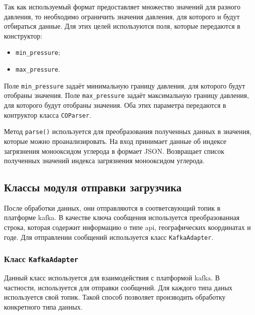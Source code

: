Так как используемый формат предоставляет множество значений для разного давления, то необходимо ограничить значения давления, для которого и будут отбираться данные.
Для этих целей используются поля, которые передаются в конструктор:
\begin{itemize}
    \item \texttt{min\_pressure};
    \item \texttt{max\_pressure}.
\end{itemize}

Поле \texttt{min\_pressure} задаёт минимальную границу давления, для которого будут отобраны значения.
Поле \texttt{max\_pressure} задаёт максимальную границу давления, для которого будут отобраны значения.
Оба этих параметра передаются в контруктор класса \texttt{COParser}.

Метод \texttt{parse()} используется для преобразования полученных данных в значения, которые можно проанализировать.
На вход принимает данные об индексе загрязнения монооксидом углерода в формает JSON.
Возвращает список полученных значений индекса загрязнения монооксидом углерода.



\subsection{Классы модуля отправки загрузчика}
После обработки данных, они отправляются в соответсвующий топик в платформе kafka. 
В качестве ключа сообщения используется преобразованная строка, которая содержит информацию о типе api, географических координатах и годе.
Для отправлении сообщений используется класс \texttt{KafkaAdapter}.

\subsubsection{Класс \texttt{KafkaAdapter}}

Данный класс используется для взаимодействия с платформой kafka.
В частности, используется для отправки сообщений.
Для каждого типа даных используется свой топик.
Такой способ позволяет производить обработку конкретного типа данных.

